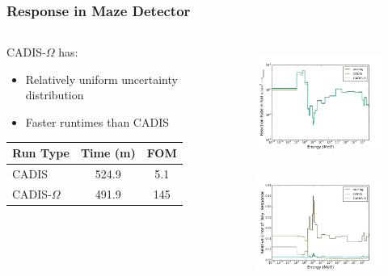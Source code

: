 \documentclass[xcolor=x11names,compress,handout]{beamer}
\renewcommand{\(}{\begin{columns}}
\renewcommand{\)}{\end{columns}}
\newcommand{\<}[1]{\begin{column}{#1}}
\renewcommand{\>}{\end{column}}
\begin{document}
%
\begin{frame}[fragile]
  \frametitle{Response in Maze Detector}
  
\begin{columns}
  \begin{column}{0.45\textwidth}
  CADIS-$\Omega$ has:
  \begin{itemize}
    \item Relatively uniform uncertainty distribution
    \item Faster runtimes than CADIS
  \end{itemize}
  \vspace*{.5em}
  \begin{tabular}{|l|c c|}
  \hline
      Run Type & Time (m) & FOM \\  
      \hline
      CADIS  & 524.9  &  5.1 \\
      CADIS-$\Omega$ & 491.9 & 145 \\
      \hline
  \end{tabular}
  \end{column}
  \begin{column}{0.55\textwidth}
  	\begin{figure}
  	\begin{center}
  		\includegraphics[height=1.5in,clip]{../figs/maze-results.png}\\
  		\includegraphics[height=1.5in,clip]{../figs/maze-re.png}
	\end{center}
  	\end{figure}
  \end{column}
\end{columns}
\end{frame}
\end{document}
